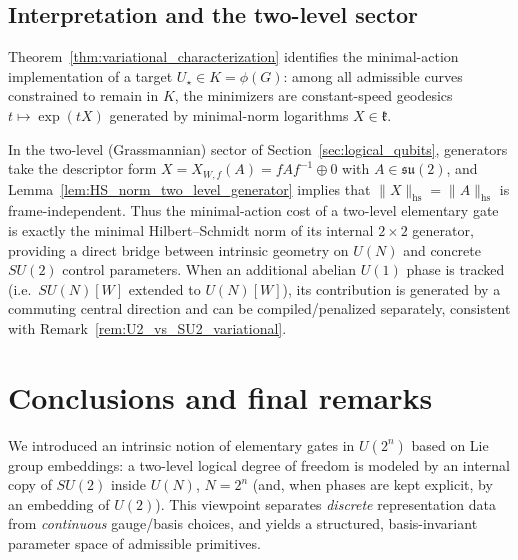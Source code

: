 \documentclass{article}%
\theoremstyle{definition}
\numberwithin{equation}{section}
\begin{document}
\subsection{Interpretation and the two-level sector}
\label{subsec:interpretation_minimal_action}

Theorem~\ref{thm:variational_characterization} identifies the minimal-action implementation of a target $U_{\star}\in K=\phi(G)$:
among all admissible curves constrained to remain in $K$, the minimizers are constant-speed geodesics
$t\mapsto\exp(tX)$ generated by minimal-norm logarithms $X\in\mathfrak{k}$.

In the two-level (Grassmannian) sector of Section~\ref{sec:logical_qubits}, generators take the descriptor form
$X=X_{W,f}(A)=fAf^{-1}\oplus 0$ with $A\in\mathfrak{su}(2)$, and Lemma~\ref{lem:HS_norm_two_level_generator} implies that
$\|X\|_{\mathrm{hs}}=\|A\|_{\mathrm{hs}}$ is frame-independent.
Thus the minimal-action cost of a two-level elementary gate is exactly the minimal Hilbert--Schmidt norm of its internal $2\times 2$
generator, providing a direct bridge between intrinsic geometry on $U(N)$ and concrete $SU(2)$ control parameters.
When an additional abelian $U(1)$ phase is tracked (i.e.\ $SU(N)[W]$ extended to $U(N)[W]$), its contribution is generated by a commuting
central direction and can be compiled/penalized separately, consistent with Remark~\ref{rem:U2_vs_SU2_variational}.

\section{Conclusions and final remarks}
\label{sec:conclusion}

We introduced an intrinsic notion of elementary gates in $U(2^n)$ based on Lie group embeddings: a two-level logical degree of freedom
is modeled by an internal copy of $SU(2)$ inside $U(N)$, $N=2^n$ (and, when phases are kept explicit, by an embedding of $U(2)$).
This viewpoint separates \emph{discrete} representation data from \emph{continuous} gauge/basis choices, and yields a structured,
basis-invariant parameter space of admissible primitives.
\end{document}
